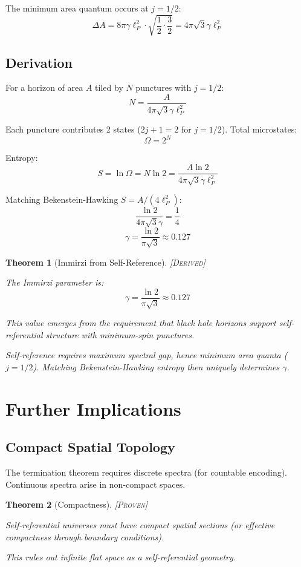 \documentclass[11pt,a4paper]{article}
\newtheorem{theorem}{Theorem}[section]
\theoremstyle{definition}
\theoremstyle{remark}
\begin{document}
The minimum area quantum occurs at $j = 1/2$:
\[
\Delta A = 8\pi\gamma \ell_P^2 \cdot \sqrt{\frac{1}{2} \cdot \frac{3}{2}} = 4\pi\sqrt{3} \gamma \ell_P^2
\]

\subsection{Derivation}

For a horizon of area $A$ tiled by $N$ punctures with $j = 1/2$:
\[
N = \frac{A}{4\pi\sqrt{3} \gamma \ell_P^2}
\]

Each puncture contributes 2 states ($2j+1 = 2$ for $j = 1/2$). Total microstates:
\[
\Omega = 2^N
\]

Entropy:
\[
S = \ln\Omega = N \ln 2 = \frac{A \ln 2}{4\pi\sqrt{3} \gamma \ell_P^2}
\]

Matching Bekenstein-Hawking $S = A/(4\ell_P^2)$:
\[
\frac{\ln 2}{4\pi\sqrt{3} \gamma} = \frac{1}{4}
\]
\[
\gamma = \frac{\ln 2}{\pi\sqrt{3}} \approx 0.127
\]

\begin{theorem}[Immirzi from Self-Reference]
\textsc{[Derived]}

The Immirzi parameter is:
\[
\gamma = \frac{\ln 2}{\pi\sqrt{3}} \approx 0.127
\]

This value emerges from the requirement that black hole horizons support self-referential structure with minimum-spin punctures.

Self-reference requires maximum spectral gap, hence minimum area quanta ($j = 1/2$). Matching Bekenstein-Hawking entropy then uniquely determines $\gamma$.
\end{theorem}

\section{Further Implications}

\subsection{Compact Spatial Topology}

The termination theorem requires discrete spectra (for countable encoding). Continuous spectra arise in non-compact spaces.

\begin{theorem}[Compactness]
\textsc{[Proven]}

Self-referential universes must have compact spatial sections (or effective compactness through boundary conditions).

This rules out infinite flat space as a self-referential geometry.
\end{theorem}
\end{document}
